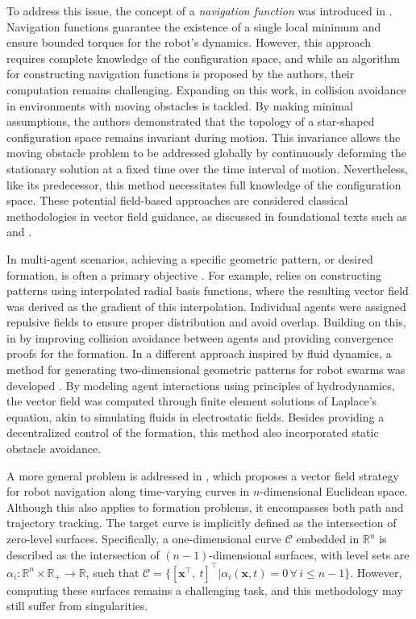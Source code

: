 To address this issue, the concept of a \emph{navigation function} was introduced in \citet{Rimon1992}. Navigation functions guarantee the existence of a single local minimum and ensure bounded torques for the robot's dynamics. However, this approach requires complete knowledge of the configuration space, and while an algorithm for constructing navigation functions is proposed by the authors, their computation remains challenging. Expanding on this work, in \citet{Conn1998} collision avoidance in environments with moving obstacles is tackled. By making minimal assumptions, the authors demonstrated that the topology of a star-shaped configuration space remains invariant during motion. This invariance allows the moving obstacle problem to be addressed globally by continuously deforming the stationary solution at a fixed time over the time interval of motion. Nevertheless, like its predecessor, this method necessitates full knowledge of the configuration space. These potential field-based approaches are considered classical methodologies in vector field guidance, as discussed in foundational texts such as \citet[p. 77]{Choset2005} and \citet[p. 299]{Spong2020}.

In multi-agent scenarios, achieving a specific geometric pattern, or desired formation, is often a primary objective \citep{Chaimowicz2005,Mong-yingA.Hsieh2006,Pimenta2007}. For example,  \citet{Chaimowicz2005} relies on constructing patterns using interpolated radial basis functions, where the resulting vector field was derived as the gradient of this interpolation. Individual agents were assigned repulsive fields to ensure proper distribution and avoid overlap. Building on this, in \citet{Mong-yingA.Hsieh2006}  by improving collision avoidance between agents and providing convergence proofs for the formation. In a different approach inspired by fluid dynamics, a method for generating two-dimensional geometric patterns for robot swarms was developed \citep{Pimenta2007}. By modeling agent interactions using principles of hydrodynamics, the vector field was computed through finite element solutions of Laplace's equation, akin to simulating fluids in electrostatic fields. Besides providing a decentralized control of the formation, this method also incorporated static obstacle avoidance.

A more general problem is addressed in \citet{goncalves2010vectorfield}, which proposes a vector field strategy for robot navigation along time-varying curves in $n$-dimensional Euclidean space. Although this also applies to formation problems, it encompasses both path and trajectory tracking. The target curve is implicitly defined as the intersection of zero-level surfaces. Specifically, a one-dimensional curve $\mathcal{C}$ embedded in $\mathbb{R}^n$ is described as the intersection of $(n-1)$-dimensional surfaces, with level sets are $\alpha_i:\mathbb{R}^n\times\mathbb{R}_+\to\mathbb{R}$, such that $\mathcal{C} = \{ [ \mathbf{x}^\top,\ t]^\top | \alpha_i(\mathbf{x}, t) = 0\,\forall\,i\le n-1 \}$. However, computing these surfaces remains a challenging task, and this methodology may still suffer from singularities.

